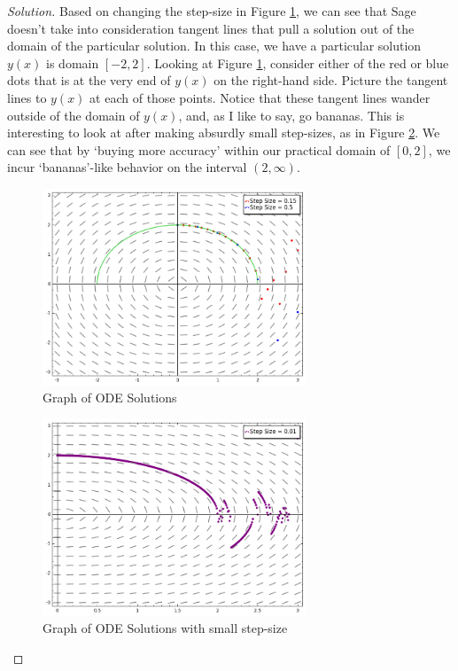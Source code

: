 \documentclass[letterpaper, 12pt]{amsart}
\theoremstyle{definition}  							%
\begin{document}
		\begin{proof}[Solution]
		Based on changing the step-size in Figure \ref{SlopeFieldSoln}, we can see that Sage doesn't take into consideration tangent lines that pull a solution out of the domain of the particular solution.
		In this case, we have a particular solution $y(x)$ is domain $[-2,2]$.
		Looking at Figure \ref{SlopeFieldSoln}, consider either of the red or blue dots that is at the very end of $y(x)$ on the right-hand side.
		Picture the tangent lines to $y(x)$ at each of those points.
		Notice that these tangent lines wander outside of the domain of $y(x)$, and, as I like to say, go bananas.
		This is interesting to look at after making absurdly small step-sizes, as in Figure \ref{bananas}.
		We can see that by `buying more accuracy' within our practical domain of $[0,2]$, we incur `bananas'-like behavior on the interval $(2,\infty)$.
			\begin{figure}[h]
				\includegraphics[width=0.7\textwidth]{images/slopeFieldSoln.png}
				\caption{Graph of ODE Solutions}
				\label{SlopeFieldSoln}
			\end{figure}
			\begin{figure}[h]
				\includegraphics[width=0.7\textwidth]{images/bananas.png}
				\caption{Graph of ODE Solutions with small step-size}
				\label{bananas}
			\end{figure}
		\end{proof}
\end{document}
